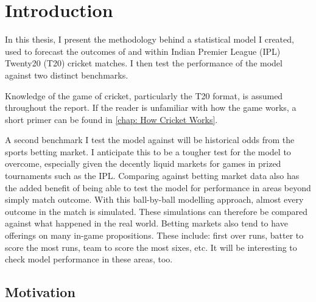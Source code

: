 \newcommand{\hsp}{\hspace{20pt}}
\titleformat{\chapter}[hang]{\Huge\bfseries}{\thechapter\hsp\textcolor{gray75}{|}\hsp}{0pt}{\Huge\bfseries}
\chapter{Introduction}


In this thesis, I present the methodology behind a statistical model I created, used to forecast the outcomes of and within\footnotemark{} Indian Premier League (IPL) Twenty20 (T20) cricket matches. I then test the performance of the model against two distinct benchmarks.


Knowledge of the game of cricket, particularly the T20 format, is assumed throughout the report. If the reader is unfamiliar with how the game works, a short primer can be found in \autoref{chap: How Cricket Works}.

A second benchmark I test the model against will be historical odds from the sports betting market. I anticipate this to be a tougher test for the model to overcome, especially given the decently liquid markets\footnotemark{} for games in prized tournaments such as the IPL. Comparing against betting market data also has the added benefit of being able to test the model for performance in areas beyond simply match outcome. With this ball-by-ball modelling approach, almost every outcome in the match is simulated. These simulations can therefore be compared against what happened in the real world. Betting markets also tend to have offerings on many in-game propositions. These include: first over runs, batter to score the most runs, team to score the most sixes, etc. It will be interesting to check model performance in these areas, too.


\section{Motivation}


